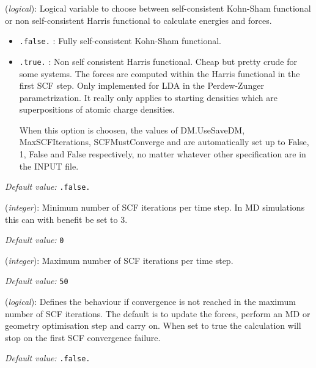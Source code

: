 \begin{description}
\itemsep 10pt
\parsep 0pt

\item[\textbf{Harris\_functional}] (\textit{logical}):
Logical variable to choose between self-consistent Kohn-Sham functional or
 non self-consistent Harris functional to calculate energies and forces.
\begin{itemize}
\item \texttt{.false.} : Fully self-consistent Kohn-Sham functional.
\item \texttt{.true.} : Non self consistent Harris functional. Cheap but
pretty crude for some systems. The forces are computed within the
Harris functional in the first SCF step. Only implemented for LDA in
the Perdew-Zunger parametrization. It really only applies to starting
densities which are superpositions of atomic charge densities.

When this option is choosen, the values of DM.UseSaveDM,
MaxSCFIterations, SCFMustConverge and  are automatically set
up to False, 1, False and False respectively, no matter whatever other
specification are in the INPUT file.
\end{itemize}

\textit{Default value:} \texttt{.false.}

\item[\textbf{MinSCFIterations}] (\textit{integer}):
Minimum number of SCF iterations per time step. In MD simulations
this can with benefit be set to 3.

\textit{Default value:} \texttt{0}

\item[\textbf{MaxSCFIterations}] (\textit{integer}):
Maximum number of SCF iterations per time step.

\textit{Default value:} \texttt{50}

\item[\textbf{SCFMustConverge}] (\textit{logical}):
Defines the behaviour if convergence is not reached in the maximum
number of SCF iterations. The default is to update the forces, perform
an MD or geometry optimisation step and carry on. When set to true
the calculation will stop on the first SCF convergence failure.

\textit{Default value:} \texttt{.false.}

\end{description}


